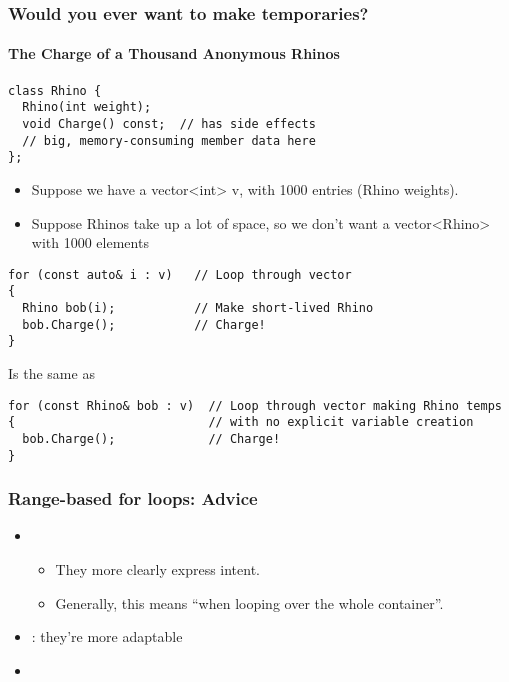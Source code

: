 

\begin{frame}[fragile]
\frametitle{Would you ever want to make temporaries?}
\framesubtitle{The Charge of a Thousand Anonymous Rhinos}
{\scriptsize \begin{verbatim}
class Rhino {
  Rhino(int weight);
  void Charge() const;  // has side effects
  // big, memory-consuming member data here
};
\end{verbatim}}
\begin{itemize}
\item Suppose we have a vector<int> v, with 1000 entries (Rhino weights).
\item Suppose Rhinos take up a lot of space, so we don't want a
  vector<Rhino> with 1000 elements
\end{itemize}

\pause{}

{\scriptsize \begin{verbatim}
for (const auto& i : v)   // Loop through vector
{
  Rhino bob(i);           // Make short-lived Rhino
  bob.Charge();           // Charge!
}
\end{verbatim}
}

\pause{}

Is the same as

{\scriptsize \begin{verbatim}
for (const Rhino& bob : v)  // Loop through vector making Rhino temps
{                           // with no explicit variable creation
  bob.Charge();             // Charge!
}
\end{verbatim}
}



\end{frame}


\begin{frame}[fragile]
\frametitle{Range-based for loops: Advice}

\begin{itemize}[<+->]

\item {}
  \begin{itemize}
    \item They more clearly express intent.
  \item Generally, this means ``when looping over the whole container''.
  \end{itemize}

\item {} : they're more adaptable

\item {}
\end{itemize}

\end{frame}
